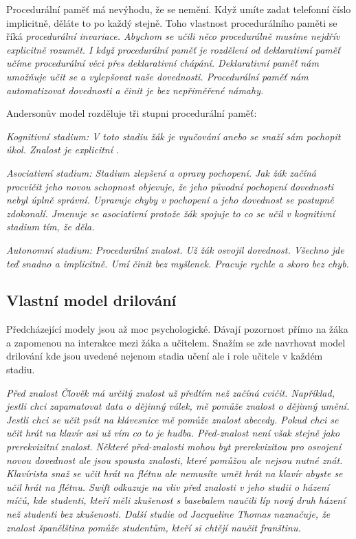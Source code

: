 Procedurální paměť má nevýhodu, že se nemění.  Když umíte zadat telefonní číslo implicitně, děláte to po každý stejně.  Toho vlastnost procedurálního paměti se říká \em procedurální invariace\em . Abychom se učili něco procedurálně musíme nejdřív explicitně rozumět.  I když procedurální paměť je rozdělení od deklarativní paměť učíme procedurální věci přes deklarativní chápání.  Deklarativní paměť nám umožňuje učit se a vylepšovat naše dovednosti.  Procedurální paměť nám automatizovat dovednosti a činit je bez nepřiměřené námahy\citep[str. 105]{robert1994handbook}.

Andersonův model rozděluje tři stupni procedurální paměť:

\em Kognitivní stadium\em : V toto stadiu žák je vyučování anebo se snaží sám pochopit úkol.  Znalost je explicitní .

\em Asociativní stadium\em : Stadium zlepšení a opravy pochopení.  Jak žák začíná procvičit jeho novou schopnost objevuje, že jeho původní pochopení dovednosti nebyl úplně správní.  Upravuje chyby v pochopení a jeho dovednost se postupně zdokonalí.  Jmenuje se asociativní protože žák spojuje to co se učil v kognitivní stadium tím, že děla.

\em Autonomní stadium\em : Procedurální znalost.  Už žák osvojil dovednost. Všechno jde teď snadno a implicitně.  Umí činit bez myšlenek. Pracuje rychle a skoro bez chyb\citep{o1987some}.

\subsection{Vlastní model drilování}

Předcházející modely jsou až moc psychologické.  Dávají pozornost přímo na žáka a zapomenou na interakce mezi žáka a učitelem.  Snažím se zde navrhovat model drilování kde jsou uvedené nejenom stadia učení ale i role učitele v každém stadiu.

\em Před znalost \em Člověk má určitý znalost už předtím než začíná cvičit. Například, jestli chci zapamatovat data o dějinný válek, mě pomůže znalost o dějinný umění.  Jestli chci se učit psát na klávesnice mě pomůže znalost abecedy. Pokud chci se učit hrát na klavír asi už vím co to je hudba.  Před-znalost není však stejně jako prerekvizitní znalost.  Některé před-znalosti mohou byt prerekvizitou pro osvojení novou dovednost ale jsou spousta znalosti, které pomůžou ale nejsou nutné znát.  Klavírista snaž se učit hrát na flétnu ale nemusíte umět hrát na klavír abyste se učil hrát na flétnu.  Swift odkazuje na vliv před znalosti v jeho studii o házení míčů, kde studenti, kteří měli zkušenost s basebalem naučili líp nový druh házení než studenti bez zkušenosti. Další studie od Jacqueline Thomas naznačuje, že znalost španělština pomůže studentům, kteří si chtějí naučit franštinu\citep{swift1903studies,thomas1988role}.


